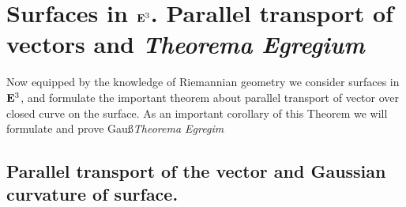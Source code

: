 \documentclass[12pt]{article}
\theoremstyle{theorem}
\numberwithin{equation}{section}
\begin{document}


\section {Surfaces in ${\bf E}^3$. Parallel transport of vectors and 
{\it Theorema Egregium}}



 Now equipped by the knowledge of Riemannian geometry we 
consider surfaces in ${\bf E}^3$, and formulate the important theorem
about parallel transport of vector over closed curve on the surface.
As an important corollary of this Theorem we will formulate
and prove Gau\ss  {\it Theorema Egregim}






\subsection {Parallel transport of the vector and
     Gaussian curvature of surface.}
\end{document}
